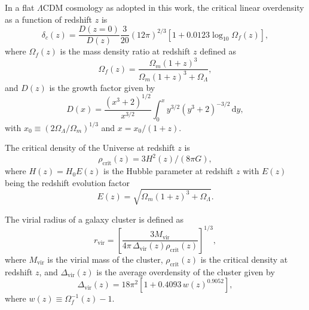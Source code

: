 \documentclass[modern]{aastex62}
\newcommand{\R}[1]{\mathrm{#1}}
\newcommand{\D}[1]{\R{d} #1}
\newcommand{\lcdm}{$\Lambda$CDM}
\begin{document}
In a flat \lcdm{} cosmology as adopted in this work, the critical linear
overdensity as a function of redshift $z$ is \citep{kitayama1996,randall2002}
\begin{equation}
  \label{eq:delta-crit}
  \delta_c(z) = \frac{D(z=0)}{D(z)} \frac{3}{20} (12\pi)^{2/3}
    \left[1 + 0.0123 \log_{10} \Omega_f(z) \right],
\end{equation}
where $\Omega_f(z)$ is the mass density ratio at redshift $z$ defined as
\begin{equation}
  \label{eq:omega-fz}
  \Omega_f(z) = \frac{\Omega_m(1+z)^3}{\Omega_m(1+z)^3 + \Omega_{\Lambda}},
\end{equation}
and $D(z)$ is the growth factor given by \citep[equation~(13.6)]{peebles1980}
\begin{equation}
  \label{eq:growth-factor}
  D(x) = \frac{(x^3 + 2)^{1/2}}{x^{3/2}}
    \int_0^x y^{3/2} (y^3 + 2)^{-3/2} \,\D{y},
\end{equation}
with $x_0 \equiv (2\Omega_{\Lambda}/\Omega_m)^{1/3}$ and $x = x_0 / (1+z)$.

The critical density of the Universe at redshift $z$ is
\begin{equation}
  \label{eq:rho-crit}
  \rho_{\R{crit}}(z) = 3 H^2(z) / (8\pi G),
\end{equation}
where $H(z) = H_0 E(z)$ is the Hubble parameter at redshift $z$
with $E(z)$ being the redshift evolution factor \citep{hogg1999}
\begin{equation}
  \label{eq:ez}
  E(z) = \sqrt{\Omega_m(1+z)^3 + \Omega_{\Lambda}}.
\end{equation}

The virial radius of a galaxy cluster is defined as
\begin{equation}
  \label{eq:radius-virial}
  r_{\R{vir}} = \left[
    \frac{3 M_{\R{vir}}}{4\pi \,\Delta_{\R{vir}}(z) \rho_{\R{crit}}(z)}
  \right]^{1/3},
\end{equation}
where $M_{\R{vir}}$ is the virial mass of the cluster,
$\rho_{\R{crit}}(z)$ is the critical density at redshift $z$,
and $\Delta_{\R{vir}}(z)$ is the average overdensity of the cluster
given by \citep{kitayama1996,cassano2005}
\begin{equation}
  \label{eq:delta-vir}
  \Delta_{\R{vir}}(z) = 18\pi^2 \left[ 1 + 0.4093 \, w(z)^{0.9052} \right],
\end{equation}
where $w(z) \equiv \Omega_f^{-1}(z) - 1$.





\end{document}

